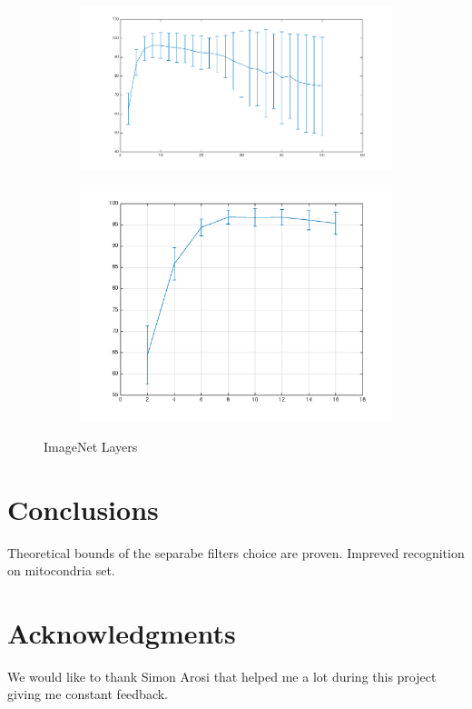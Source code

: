 \documentclass{article} %
\begin{document}
\begin{figure}[h]
  \centering
  \begin{subfigure}[b]{0.40\textwidth}
   \includegraphics[width=\textwidth]{images/Layer3ImageNet.png}
    \caption{}
  \end{subfigure}
  \begin{subfigure}[b]{0.40\textwidth}
    \includegraphics[width=\textwidth]{images/Layer4ImageNet.png}
    \caption{}
  \end{subfigure}
  \caption{ImageNet Layers}
  \label{fig:user_artiststribution}
\end{figure}

\section{Conclusions}
Theoretical bounds of the separabe filters choice are proven.
Impreved recognition on mitocondria set.

\section*{Acknowledgments}
We would like to thank Simon Arosi that helped me a lot during this project giving me constant feedback.



\end{document}
